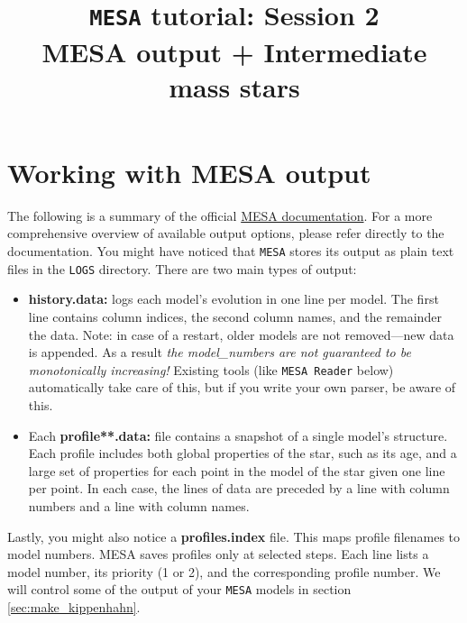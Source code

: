 \documentclass[11pt,a4paper]{article}
\begin{document}
\title{
    \textbf{\texttt{MESA} tutorial: Session 2} \\
    \textbf{\Large MESA output + Intermediate mass stars}
}
\date{}
\maketitle
\vspace{-2cm}





\section{Working with MESA output}

The following is a summary of the official \href{https://docs.mesastar.org/en/latest/using_mesa/output.html}{MESA documentation}. For a more comprehensive overview of available output options, please refer directly to the documentation.
%
You might have noticed that \texttt{MESA} stores its output as plain text files in the \texttt{LOGS} directory. 
%
There are two main types of output:

\begin{itemize}
  \item \textbf{history.data:} logs each model's evolution in one line per model. The first line contains column indices, the second column names, and the remainder the data. Note: in case of a restart, older models are not removed—new data is appended. As a result \textit{the model\_numbers are not guaranteed to be monotonically increasing!} Existing tools (like \texttt{MESA Reader} below) automatically take care of this, but if you write your own parser, be aware of this.
  
  \item Each \textbf{profile**.data:} file contains a snapshot of a single model's structure. Each profile includes both global properties of the star, such as its age, and a large set of properties for each point in the model of the star given one line per point. In each case, the lines of data are preceded by a line with column numbers and a line with column names. 

\end{itemize}

\noindent Lastly, you might also notice a \textbf{profiles.index} file. This maps profile filenames to model numbers. MESA saves profiles only at selected steps. Each line lists a model number, its priority (1 or 2), and the corresponding profile number.
%
We will control some of the output of your \texttt{MESA} models in section \ref{sec:make_kippenhahn}.
\end{document}
